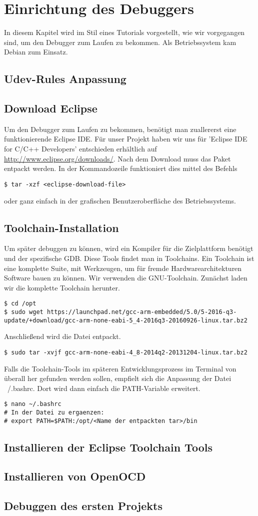 \documentclass[12pt,a4paper]{article}
\author{Jonathan Weißenberger}
\begin{document}
\section{Einrichtung des Debuggers}
In diesem Kapitel wird im Stil eines Tutorials vorgestellt, wie wir vorgegangen sind, um den Debugger zum Laufen zu bekommen. Als Betriebssystem kam Debian zum Einsatz.
\subsection{Udev-Rules Anpassung}
\subsection{Download Eclipse}
Um den Debugger zum Laufen zu bekommen, benötigt man zuallererst eine funktionierende Eclipse IDE. Für unser Projekt haben wir uns für 'Eclipse IDE for C/C++ Developers' entschieden erhältlich auf \url{http://www.eclipse.org/downloads/}.
Nach dem Download muss das Paket entpackt werden. In der Kommandozeile funktioniert dies mittel des Befehls 
\begin{lstlisting} 
$ tar -xzf <eclipse-download-file>
\end{lstlisting}
oder ganz einfach in der grafischen Benutzeroberfläche des Betriebssystems.
\subsection{Toolchain-Installation}
Um später debuggen zu können, wird ein Kompiler für die Zielplattform benötigt und der spezifische GDB. Diese Tools findet man in Toolchains. Ein Toolchain ist eine komplette Suite, mit Werkzeugen, um für fremde Hardwarearchitekturen Software bauen zu können.
Wir verwenden die GNU-Toolchain. Zunächst laden wir die komplette Toolchain herunter.
\begin{lstlisting}
$ cd /opt
$ sudo wget https://launchpad.net/gcc-arm-embedded/5.0/5-2016-q3-update/+download/gcc-arm-none-eabi-5_4-2016q3-20160926-linux.tar.bz2
\end{lstlisting}
Anschließend wird die Datei entpackt.
\begin{lstlisting}
$ sudo tar -xvjf gcc-arm-none-eabi-4_8-2014q2-20131204-linux.tar.bz2
\end{lstlisting}
Falls die Toolchain-Tools im späteren Entwicklungsprozess im Terminal von überall her gefunden werden sollen, empfielt sich die Anpassung der Datei ~/.bashrc. Dort wird dann einfach die PATH-Variable erweitert.
\begin{lstlisting}
$ nano ~/.bashrc
# In der Datei zu ergaenzen:
# export PATH=$PATH:/opt/<Name der entpackten tar>/bin
\end{lstlisting}
\subsection{Installieren der Eclipse Toolchain Tools}
\subsection{Installieren von OpenOCD}
\subsection{Debuggen des ersten Projekts}
\end{document}
